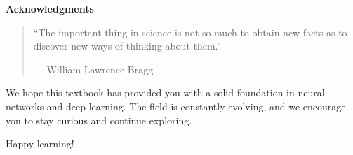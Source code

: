 \newpage
\thispagestyle{empty}

\vspace*{3cm}

\begin{center}
    \Large\textbf{Acknowledgments}
\end{center}

\vspace{2cm}

\begin{quotation}
    ``The important thing in science is not so much to obtain new facts as to discover new ways of thinking about them.''

    \vspace{1cm}

    --- William Lawrence Bragg
\end{quotation}

\vspace{3cm}

We hope this textbook has provided you with a solid foundation in neural networks and deep learning. The field is constantly evolving, and we encourage you to stay curious and continue exploring.

Happy learning!


